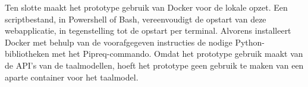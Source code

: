 \medspace

Ten slotte maakt het prototype gebruik van Docker voor de lokale opzet. Een scriptbestand, in Powershell of Bash, vereenvoudigt de opstart van deze webapplicatie, in tegenstelling tot de opstart per terminal. Alvorens installeert Docker met behulp van de voorafgegeven instructies de nodige Python-bibliotheken met het Pipreq-commando. Omdat het prototype gebruik maakt van de API's van de taalmodellen, hoeft het prototype geen gebruik te maken van een aparte container voor het taalmodel.

